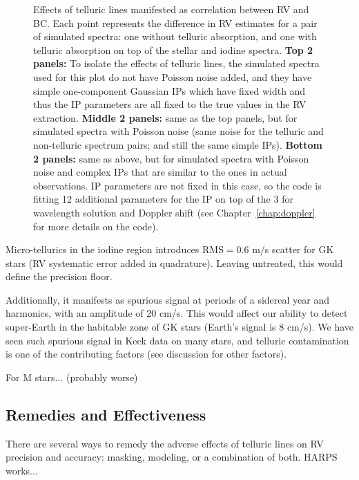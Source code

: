 \begin{figure}
\caption{Effects of telluric lines manifested as correlation between
  RV and BC. Each point represents the difference in RV estimates for
  a pair of simulated spectra: one without telluric absorption, and
  one with telluric absorption on top of the stellar and iodine
  spectra. {\bf Top 2 panels:} To isolate the effects of telluric
  lines, the simulated spectra used for this plot do not have Poisson
  noise added, and they have simple one-component Gaussian IPs which
  have fixed width and thus the IP parameters are all fixed to the
  true values in the RV extraction. {\bf Middle 2 panels:} same as the
  top panels, but for simulated spectra with Poisson noise (same noise
  for the telluric and non-telluric spectrum pairs; and still the same
  simple IPs). {\bf Bottom 2 panels:} same as above, but for simulated
  spectra with Poisson noise and complex IPs that are similar to the
  ones in actual observations. IP parameters are not fixed in this
  case, so the code is fitting 12 additional parameters for the IP on
  top of the 3 for wavelength solution and Doppler shift (see
  Chapter~\ref{chap:doppler} for more details on the code).
\label{telluric:fig:sim}}
\end{figure}


Micro-tellurics in the iodine region introduces RMS$=0.6$ m/s scatter
for GK stars (RV systematic error added in quadrature). Leaving
untreated, this would define the precision floor.

Additionally, it manifests as spurious signal at periods of a sidereal
year and harmonics, with an amplitude of 20 cm/s. This would affect
our ability to detect super-Earth in the habitable zone of GK stars
(Earth's signal is 8 cm/s). We have seen such spurious signal in Keck
data on many stars, and telluric contamination is one of the
contributing factors (see discussion for other factors).

For M stars... (probably worse)


\subsection{Remedies and Effectiveness}

There are several ways to remedy the adverse effects of telluric lines
on RV precision and accuracy: masking, modeling, or a combination of
both. HARPS works...

